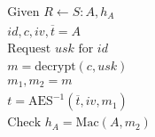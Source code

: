 \documentclass{article}
\newcommand{\ct}{\overline{t}}
\begin{document}
\begin{align*}
& \text{Given~} R \longleftarrow S: A, h_A \\
& id, c, iv, \ct = A \\
& \text{Request~} usk \text{~for~} id \\
& m = \text{decrypt}(c, usk) \\
& m_1, m_2 = m \\
& t = \text{AES}^{-1}(\ct, iv, m_1) \\
& \text{Check~} h_A = \text{Mac}(A, m_2)
\end{align*}
\end{document}
